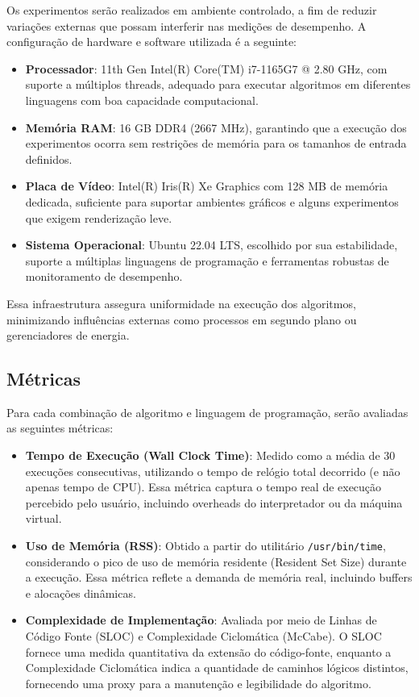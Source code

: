 \documentclass[12pt, a4paper]{article}
\begin{document}
Os experimentos serão realizados em ambiente controlado, a fim de reduzir variações externas que possam interferir nas medições de desempenho. A configuração de hardware e software utilizada é a seguinte:

\begin{itemize}
    \item \textbf{Processador}: 11th Gen Intel(R) Core(TM) i7-1165G7 @ 2.80 GHz, com suporte a múltiplos threads, adequado para executar algoritmos em diferentes linguagens com boa capacidade computacional.
    \item \textbf{Memória RAM}: 16 GB DDR4 (2667 MHz), garantindo que a execução dos experimentos ocorra sem restrições de memória para os tamanhos de entrada definidos.
    \item \textbf{Placa de Vídeo}: Intel(R) Iris(R) Xe Graphics com 128 MB de memória dedicada, suficiente para suportar ambientes gráficos e alguns experimentos que exigem renderização leve.
    \item \textbf{Sistema Operacional}: Ubuntu 22.04 LTS, escolhido por sua estabilidade, suporte a múltiplas linguagens de programação e ferramentas robustas de monitoramento de desempenho.
\end{itemize}

Essa infraestrutura assegura uniformidade na execução dos algoritmos, minimizando influências externas como processos em segundo plano ou gerenciadores de energia.

\subsection{Métricas}

Para cada combinação de algoritmo e linguagem de programação, serão avaliadas as seguintes métricas:

\begin{itemize}
    \item \textbf{Tempo de Execução (Wall Clock Time)}: Medido como a média de 30 execuções consecutivas, utilizando o tempo de relógio total decorrido (e não apenas tempo de CPU). Essa métrica captura o tempo real de execução percebido pelo usuário, incluindo overheads do interpretador ou da máquina virtual.
    \item \textbf{Uso de Memória (RSS)}: Obtido a partir do utilitário \texttt{/usr/bin/time}, considerando o pico de uso de memória residente (Resident Set Size) durante a execução. Essa métrica reflete a demanda de memória real, incluindo buffers e alocações dinâmicas.
    \item \textbf{Complexidade de Implementação}: Avaliada por meio de Linhas de Código Fonte (SLOC) e Complexidade Ciclomática (McCabe). O SLOC fornece uma medida quantitativa da extensão do código-fonte, enquanto a Complexidade Ciclomática indica a quantidade de caminhos lógicos distintos, fornecendo uma proxy para a manutenção e legibilidade do algoritmo.
\end{itemize}
\end{document}
